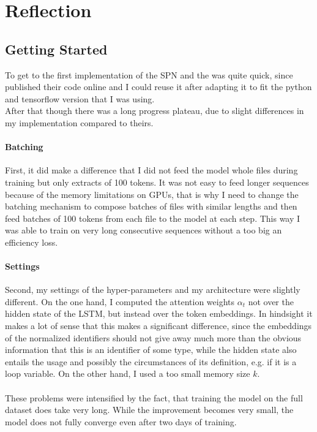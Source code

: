 \documentclass[11pt]{article}
\begin{document}
\section{Reflection}
\subsection{Getting Started}
To get to the first implementation of the SPN and the \lmatt was quite quick, since \cite{bhoopchand2016learning} published their code online and I could reuse it after adapting it to fit the python and tensorflow version that I was using.\\
After that though there was a long progress plateau, due to slight differences in my implementation compared to theirs.
\paragraph{Batching} First, it did make a difference that I did not feed the model whole files during training but only extracts of 100 tokens. It was not easy to feed longer sequences because of the memory limitations on GPUs, that is why I need to change the batching mechanism to compose batches of files with similar lengths and then feed batches of 100 tokens from each file to the model at each step. This way I was able to train on very long consecutive sequences without a too big an efficiency loss.
\paragraph{Settings} Second, my settings of the hyper-parameters and my architecture were slightly different. On the one hand, I computed the attention weights $\alpha_t$ not over the hidden state of the LSTM, but instead over the token embeddings. In hindsight it makes a lot of sense that this makes a significant difference, since the embeddings of the normalized identifiers should not give away much more than the obvious information that this is an identifier of some type, while the hidden state also entails the usage and possibly the circumstances of its definition, e.g. if it is a loop variable. On the other hand, I used a too small memory size $k$.
\\\\
These problems were intensified by the fact, that training the model on the full dataset does take very long. While the improvement becomes very small, the model does not fully converge even after two days of training.
\end{document}
